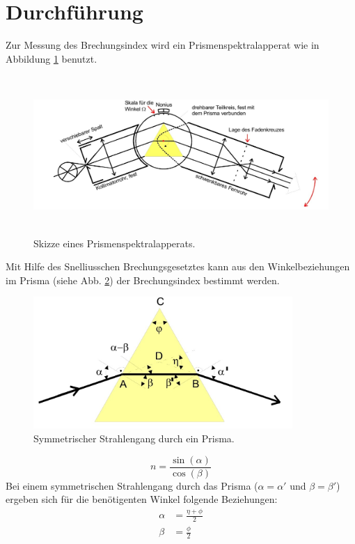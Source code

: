 \section{Durchführung}
\label{sec:Durchführung}

Zur Messung des Brechungsindex wird ein Prismenspektralapperat wie in Abbildung \ref{fig:j3} benutzt.
\begin{figure}
  \centering
  \includegraphics[height=6cm]{data/j3.jpg}
  \caption{Skizze eines Prismenspektralapperats. \cite{sample}}
  \label{fig:j3}
\end{figure}
Mit Hilfe des Snelliusschen Brechungsgesetztes kann aus den Winkelbeziehungen im Prisma (siehe Abb. \ref{fig:j4}) der Brechungsindex bestimmt werden.
\begin{figure}
  \centering
  \includegraphics[height=5cm]{data/j4.jpg}
  \caption{Symmetrischer Strahlengang durch ein Prisma. \cite{sample}}
  \label{fig:j4}
\end{figure}
\begin{equation}
  n = \frac{\sin(\alpha)}{\cos(\beta)}
\end{equation}
Bei einem symmetrischen Strahlengang durch das Prisma ($\alpha = \alpha'$ und $\beta = \beta'$) ergeben sich für die benötigenten Winkel folgende Beziehungen:
\begin{align}
  \alpha &= \frac{\eta + \phi}{2} \\
  \beta &= \frac{\phi}{2}
\end{align}

